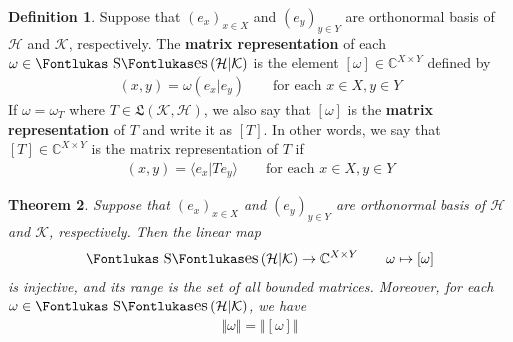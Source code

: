 \documentclass[12pt,b5paper,notitlepage]{article}
\theoremstyle{definition}
\newtheorem{df}{Definition}[subsection]
\theoremstyle{plain}
\newtheorem{thm}[df]{Theorem}
\DeclareMathOperator{\Ses}{\text{\Fontlukas S}\text{\kern -0pt {\Fontlukas\large es}}\,}
\newcommand{\fk}{\mathfrak}
\newcommand{\bk}[1]{\langle {#1}\rangle}
\newcommand{\Cbb}{\mathbb C}
\newcommand{\MH}{\mathcal H}
\newcommand{\MK}{\mathcal K}
\numberwithin{equation}{section}
\begin{document}
\begin{df}
Suppose that $(e_x)_{x\in X}$ and $(e_y)_{y\in Y}$ are orthonormal basis of $\MH$ and $\MK$, respectively. The \textbf{matrix representation}  of each $\omega\in\Ses(\MH|\MK)$ is the element $[\omega]\in\Cbb^{X\times Y}$ defined by
\begin{align*}
[\omega](x,y)=\omega(e_x|e_y)\qquad\text{for each }x\in X,y\in Y
\end{align*}  
If $\omega=\omega_T$ where $T\in\fk L(\MK,\MH)$, we also say that $[\omega]$ is the \textbf{matrix representation} of $T$ and write it as $[T]$. In other words, we say that $[T]\in\Cbb^{X\times Y}$ is the matrix representation of $T$ if
\begin{align*}
[T](x,y)=\bk{e_x|Te_y}\qquad\text{for each }x\in X,y\in Y
\end{align*}
\end{df}



\begin{thm}\label{lb142}
Suppose that $(e_x)_{x\in X}$ and $(e_y)_{y\in Y}$ are orthonormal basis of $\MH$ and $\MK$, respectively. Then the linear map
\begin{gather}\label{eq70}
\Ses(\MH|\MK)\rightarrow\Cbb^{X\times Y}\qquad \omega\mapsto[\omega]
\end{gather}
is injective, and its range is the set of all bounded matrices. Moreover, for each $\omega\in\Ses(\MH|\MK)$, we have
\begin{align*}
\big\Vert\omega\big\Vert=\big\Vert[\omega]\big\Vert
\end{align*}
\end{thm}
\end{document}
